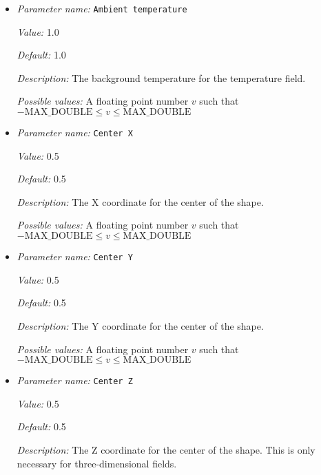 \begin{itemize}
\item {\it Parameter name:} {\tt Ambient temperature}
\label{parameters:Initial temperature model/Inclusion shape perturbation/Ambient temperature}


{\it Value:} 1.0


{\it Default:} 1.0


{\it Description:} The background temperature for the temperature field.


{\it Possible values:} A floating point number $v$ such that $-\text{MAX\_DOUBLE} \leq v \leq \text{MAX\_DOUBLE}$
\item {\it Parameter name:} {\tt Center X}
\label{parameters:Initial temperature model/Inclusion shape perturbation/Center X}


{\it Value:} 0.5


{\it Default:} 0.5


{\it Description:} The X coordinate for the center of the shape.


{\it Possible values:} A floating point number $v$ such that $-\text{MAX\_DOUBLE} \leq v \leq \text{MAX\_DOUBLE}$
\item {\it Parameter name:} {\tt Center Y}
\label{parameters:Initial temperature model/Inclusion shape perturbation/Center Y}


{\it Value:} 0.5


{\it Default:} 0.5


{\it Description:} The Y coordinate for the center of the shape.


{\it Possible values:} A floating point number $v$ such that $-\text{MAX\_DOUBLE} \leq v \leq \text{MAX\_DOUBLE}$
\item {\it Parameter name:} {\tt Center Z}
\label{parameters:Initial temperature model/Inclusion shape perturbation/Center Z}


{\it Value:} 0.5


{\it Default:} 0.5


{\it Description:} The Z coordinate for the center of the shape. This is only necessary for three-dimensional fields.



\end{itemize}
